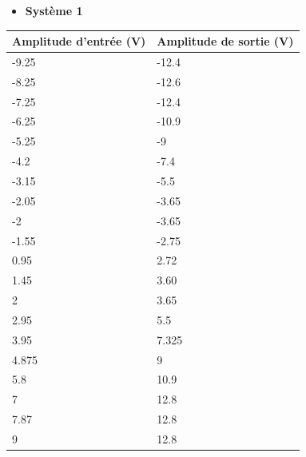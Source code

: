 \documentclass[12pt]{article}
\begin{document}
\begin{itemize}
    \item \bf \large Système 1
\end{itemize}
\begin{center}
    \begin{tabular}{ |p{3cm}|p{3cm}|}

        \hline
        Amplitude d'entrée (V) & Amplitude de sortie (V)\\
        \hline
        -9.25 & -12.4 \\
        -8.25 & -12.6\\
        -7.25 & -12.4  \\
        -6.25 & -10.9 \\
        -5.25 & -9  \\
        -4.2 & -7.4  \\
        -3.15 & -5.5\\
        -2.05& -3.65  \\
        -2 & -3.65\\
        -1.55 & -2.75 \\
        0.95 & 2.72 \\
        1.45 & 3.60 \\
        2 & 3.65 \\
        2.95 & 5.5 \\
        3.95 & 7.325  \\
        4.875 & 9  \\
        5.8 & 10.9  \\
        7 & 12.8  \\
        7.87 & 12.8  \\
        9 & 12.8  \\
        
        \hline
        \end{tabular}
    \end{center}
\end{document}
